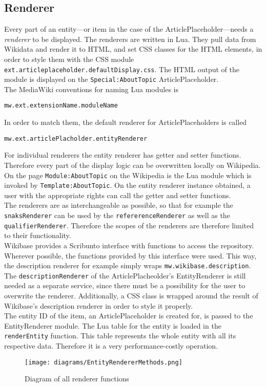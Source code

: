 \subsection{Renderer}

Every part of an entity---or item in the case of the ArticlePlaceholder---needs a \textit{renderer} to be displayed. The renderers are written in Lua. They pull data from Wikidata and render it to HTML, and set CSS classes for the HTML elements, in order to style them with the CSS module \texttt{\justify ext.articleplaceholder.defaultDisplay.css}. The HTML output of the module is displayed on the \texttt{\justify Special:AboutTopic} ArticlePlaceholder. \\
The MediaWiki conventions for naming Lua modules is 
\begin{center}
\texttt{\justify mw.ext.extensionName.moduleName} 
\end{center}
In order to match them, the default renderer for ArticlePlaceholders is called 
\begin{center}
\texttt{\justify mw.ext.articlePlacholder.entityRenderer}
\end{center}
For individual renderers the entity renderer has getter and setter functions. Therefore every part of the display logic can be overwritten locally on Wikipedia. \\
On the page \texttt{\justify Module:AboutTopic} on the Wikipedia is the Lua module which is invoked by \texttt{\justify Template:AboutTopic}. On the entity renderer instance obtained, a user with the appropriate rights can call the getter and setter functions. \\
The renderers are as interchangeable as possible, so that for example the \texttt{\justify snaksRenderer} can be used by the \texttt{\justify refererenceRenderer} as well as the \texttt{\justify qualifierRenderer}. Therefore the scopes of the renderers are therefore limited to their functionality. \\
Wikibase provides a Scribunto interface with functions to access the repository. Wherever possible, the functions provided by this interface were used. This way, the description renderer for example simply wraps \texttt{\justify mw.wikibase.description}. The \texttt{\justify descriptionRenderer} of the ArticlePlacheolder's EntityRenderer is still needed as a separate service, since there must be a possibility for the user to overwrite the renderer. Additionally, a CSS class is wrapped around the result of Wikibase's description renderer in order to style it properly. \\
The entity ID of the item, an ArticlePlaceholder is created for, is passed to the EntityRenderer module. The Lua table for the entity is loaded in the \texttt{\justify renderEntity} function. This table represents the whole entity with all its respective data. Therefore it is a very performance-costly operation. \\

\begin{figure}[H]
	\centering
	\texttt{[image: diagrams/EntityRendererMethods.png]}
	\caption{Diagram of all renderer functions}
	\label{fig:renderer}
\end{figure}